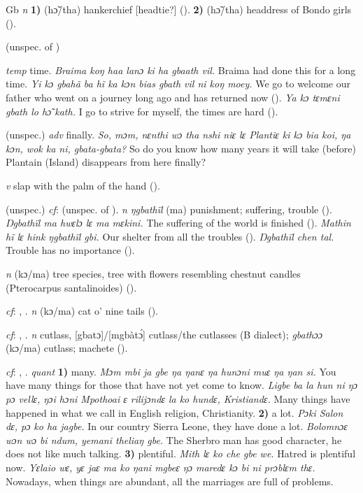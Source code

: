 \begin{letter}{Gb}
 \textit{n} \textbf{1)} (hɔ̃/tha) hankerchief [headtie?] (\citealt{Pichl1967}). \textbf{2)} (hɔ̃/tha) headdress of Bondo girls (\citealt{Pichl1967}).

 (unspec. of )

 \textit{temp} time. \textit{Braima koŋ haa lanɔ ki ha gbaath vil.} Braima had done this for a long time. \textit{Yi kɔ gbahã ba hĩ ka kɔn bias gbath vil ni koŋ moey.} We go to welcome our father who went on a journey long ago and has returned now (\citealt{Pichl1967}). \textit{Ya kɔ tɛmɛni gbath lo hɔ̃ kath.} I go to strive for myself, the times are hard (\citealt{Pichl1967}). 

 (unspec.) \textit{adv} finally. \textit{So, mɔm, nɛnthi wɔ tha nshi niɛ lɛ Plantiɛ ki kɔ bia koi, ŋa kɔn, wok ka ni, gbata-gbata?} So do you know how many years it will take (before) Plantain (Island) disappears from here finally? 

 \textit{v} slap with the palm of the hand (\citealt{Pichl1967}). 

 (unspec.) \textit{cf}:  (unspec. of ). \textit{n} \textit{ŋgbathïl} (ma) punishment; suffering, trouble (\citealt{Pichl1967}). \textit{Ŋgbathïl ma hwɛlɔ lɛ ma mɛkini.} The suffering of the world is finished (\citealt{Pichl1967}). \textit{Mathin hĩ lɛ hink ŋgbathïl gbi.} Our shelter from all the troubles (\citealt{Pichl1967}). \textit{Ŋgbathïl chen tal.} Trouble has no importance (\citealt{Pichl1967}). 

 \textit{n} (kɔ/ma) tree species, tree with flowers resembling chestnut candles (Pterocarpus santalinoides) (\citealt{Pichl1967}). 

 \textit{cf}: , . \textit{n} (kɔ/ma) cat o' nine tails (\citealt{Pichl1967}). 

 \textit{cf}: , . \textit{n} cutlass, [gbatɔ]/[mgbàtɔ́] cutlass/the cutlasses (B dialect); \textit{gbathɔɔ} (kɔ/ma) cutlass; machete (\citealt{Pichl1967}).

 \textit{cf}: , . \textit{quant} \textbf{1)} many. \textit{Mɔm mbi ja gbe ŋa ŋanɛ ŋa hunɔni muɛ ŋa ŋan si.} You have many things for those that have not yet come to know. \textit{Ligbe ba la hun ni ŋɔ pɔ vellɛ, ŋɔi hɔni Mpothoai ɛ rilijɔndɛ la ko hundɛ, Kristiandɛ.} Many things have happened in what we call in English religion, Christianity. \textbf{2)} a lot. \textit{Pɔki Salon dɛ, pɔ ko ha jagbe.} In our country Sierra Leone, they have done a lot. \textit{Bolomnɔɛ wɔn wɔ bi ndum, yemani theliaŋ gbe.} The Sherbro man has good character, he does not like much talking. \textbf{3)} plentiful. \textit{Mith lɛ ko che gbe we.} Hatred is plentiful now. \textit{Yɛlaio wɛ, yɛ jaɛ ma ko ŋani mgbeɛ ŋɔ maredɛ kɔ bi ni prɔblɛm thɛ.} Nowadays, when things are abundant, all the marriages are full of problems.


\end{letter}
